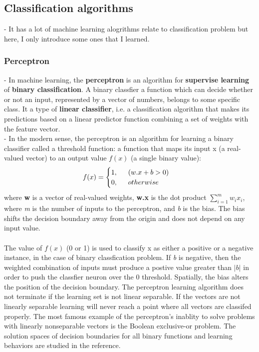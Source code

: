 \subsection{Classification algorithms}
- It has a lot of machine learning alogrithms relate to classification problem but here, I only introduce some ones that I learned.
\subsubsection{Perceptron}
- In machine learning, the \textbf{perceptron} is an algorithm for \textbf{supervise learning} of \textbf{binary classification}. A binary classfier a function which can decide whether or not an input, represented by a vector of numbers, belongs to some specific class. It a type of \textbf{linear classifier}, i.e. a classification algorithm that makes its predictions based on a linear predictor function combining a set of weights with the feature vector.\\
- In the modern sense, the perceptron is an algorithm for learning a binary classifier called a threshold function: a function that maps its input x (a real-valued vector) to an output value $f(x)$ (a single binary value):\\
$$
f(x) = 
\begin{cases}
1, \indent (w.x + b > 0)\\
0, \indent otherwise
\end{cases}
$$
where \textbf{w} is a vector of real-valued weights, \textbf{w.x} is the dot product $\sum_{i=1}^{m}w_{i}x_{i}$, where \textit{m} is the number of inputs to the perceptron, and \textit{b} is the bias. The bias shifts the decision boundary away from the origin and does not depend on any input value.\\
\\
The value of $f(x)$ (0 or 1) is used to classify x as either a positive or a negative instance, in the case of binary classfication problem. If \textit{b} is negative, then the weighted combination of inputs must produce a postive value greater than $|b|$ in order to push the classfier neuron over the 0 threshold. Spatially, the bias alters the position of the decision boundary. The perceptron learning algorithm does not terminate if the learning set is not linear separable. If the vectors are not linearly separable learning will never reach a point where all vectors are classifed properly. The most famous example of the perceptron's inablity to solve problems with linearly nonseparable vectors is the Boolean exclusive-or problem. The solution spaces of decision boundaries for all binary functions and learning behaviors are studied in the reference.\\
